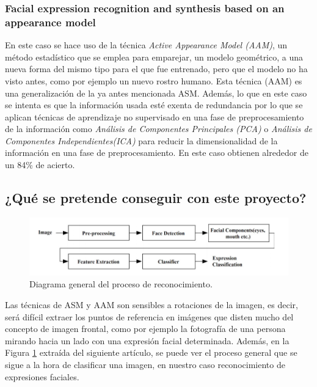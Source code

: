 \documentclass[a4paper,11pt]{book}
\begin{document}
\subsubsection{Facial expression recognition and synthesis based on an appearance model\cite{abboud_davoine_dang04}}
En este caso se hace uso de la técnica \textit{Active Appearance Model (AAM)}\cite{cootes_edwards_taylor98}, un método estadístico que se emplea para emparejar, un modelo geométrico, a una nueva forma del mismo tipo para el que fue entrenado, pero que el modelo no ha visto antes, como por ejemplo un nuevo rostro humano. Esta técnica (AAM)  es una generalización de la ya antes mencionada ASM\cite{cootes_taylor_cooper_graham94}.
Además, lo que en este caso se intenta es que la información usada esté exenta de redundancia por lo que se aplican técnicas de aprendizaje no supervisado en una fase de preprocesamiento de la información como \textit{Análisis de Componentes Principales (PCA)} o \textit{Análisis de Componentes Independientes(ICA)} para reducir la dimensionalidad de la información  en una fase de preprocesamiento. En este caso obtienen alrededor de un 84\% de acierto.

\subsection{¿Qué se pretende conseguir con este proyecto?}
\label{subsec:aspirations}
\begin{figure}[!]
	\centering
	\includegraphics[width=0.7\linewidth]{imagenes/feg_diagram}
	\caption[Diagrama FER]{Diagrama general del proceso de reconocimiento.}
	\label{fig:feg_diagram}
\end{figure}
Las técnicas de ASM\cite{cootes_taylor_cooper_graham94} y AAM\cite{cootes_edwards_taylor98} son sensibles a rotaciones de la imagen, es decir, será difícil extraer los puntos de referencia en imágenes que disten mucho del concepto de imagen frontal, como por ejemplo la fotografía de una persona mirando hacia un lado con una expresión facial determinada. Además, en la Figura \ref{fig:feg_diagram} extraída del siguiente artículo\cite{kumari_rajesh_pooja15}, se puede ver el proceso general que se sigue a la hora de clasificar una imagen, en nuestro caso reconocimiento de expresiones faciales.\\
\end{document}
